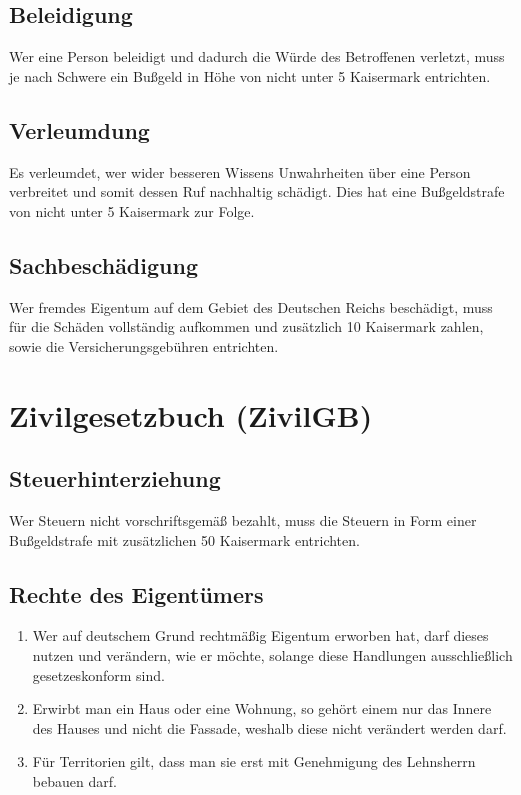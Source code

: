 \documentclass{article}
\begin{document}
\subsection{Beleidigung}
Wer eine Person beleidigt und dadurch die Würde des Betroffenen verletzt, muss je nach Schwere ein Bußgeld in Höhe von nicht unter 5 Kaisermark entrichten.

\subsection{Verleumdung}
Es verleumdet, wer wider besseren Wissens Unwahrheiten über eine Person verbreitet und somit dessen Ruf nachhaltig schädigt. Dies hat eine Bußgeldstrafe von nicht unter 5 Kaisermark zur Folge.

\subsection{Sachbeschädigung}
Wer fremdes Eigentum auf dem Gebiet des Deutschen Reichs beschädigt, muss für die Schäden vollständig aufkommen und zusätzlich 10 Kaisermark zahlen, sowie die Versicherungsgebühren entrichten.

\newpage
\section{Zivilgesetzbuch (ZivilGB)}
\localtableofcontents

\subsection{Steuerhinterziehung}\label{hinterz}
Wer Steuern nicht vorschriftsgemäß bezahlt, muss die Steuern in Form einer Bußgeldstrafe mit zusätzlichen 50 Kaisermark entrichten.

\subsection{Rechte des Eigentümers}
\begin{enumerate}[(1)]
    \item Wer auf deutschem Grund rechtmäßig Eigentum erworben hat, darf dieses nutzen und verändern, wie er möchte, solange diese Handlungen ausschließlich gesetzeskonform sind.
    \item Erwirbt man ein Haus oder eine Wohnung, so gehört einem nur das Innere des Hauses und nicht die Fassade, weshalb diese nicht verändert werden darf.
    \item Für Territorien gilt, dass man sie erst mit Genehmigung des Lehnsherrn bebauen darf.
\end{enumerate}
\end{document}
